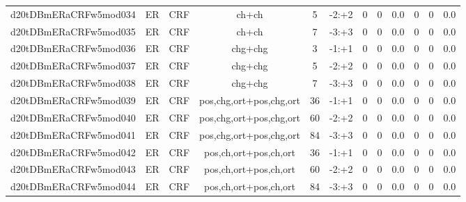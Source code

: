 \documentclass[a4paper]{article}
\begin{document}
\begin{landscape}
\begin{center}
\begin{tabular}{ |c|c|c|c|c|c|c|c|c|c|c|c|}
 
 	
 	\small{ d20tDBmERaCRFw5mod034 } & ER & CRF & ch+ch  &  5 &  -2:+2  &  0 & 0 & 0.0  &  0 & 0 & 0.0 \\
 	

 
 	
 	\small{ d20tDBmERaCRFw5mod035 } & ER & CRF & ch+ch  &  7 &  -3:+3  &  0 & 0 & 0.0  &  0 & 0 & 0.0 \\
 	

 
 	
 	\small{ d20tDBmERaCRFw5mod036 } & ER & CRF & chg+chg  &  3 &  -1:+1  &  0 & 0 & 0.0  &  0 & 0 & 0.0 \\
 	

 
 	
 	\small{ d20tDBmERaCRFw5mod037 } & ER & CRF & chg+chg  &  5 &  -2:+2  &  0 & 0 & 0.0  &  0 & 0 & 0.0 \\
 	

 
 	
 	\small{ d20tDBmERaCRFw5mod038 } & ER & CRF & chg+chg  &  7 &  -3:+3  &  0 & 0 & 0.0  &  0 & 0 & 0.0 \\
 	

 
 	
 	\small{ d20tDBmERaCRFw5mod039 } & ER & CRF & pos,chg,ort+pos,chg,ort  &  36 &  -1:+1  &  0 & 0 & 0.0  &  0 & 0 & 0.0 \\
 	

 
 	
 	\small{ d20tDBmERaCRFw5mod040 } & ER & CRF & pos,chg,ort+pos,chg,ort  &  60 &  -2:+2  &  0 & 0 & 0.0  &  0 & 0 & 0.0 \\
 	

 
 	
 	\small{ d20tDBmERaCRFw5mod041 } & ER & CRF & pos,chg,ort+pos,chg,ort  &  84 &  -3:+3  &  0 & 0 & 0.0  &  0 & 0 & 0.0 \\
 	

 
 	
 	\small{ d20tDBmERaCRFw5mod042 } & ER & CRF & pos,ch,ort+pos,ch,ort  &  36 &  -1:+1  &  0 & 0 & 0.0  &  0 & 0 & 0.0 \\
 	

 
 	
 	\small{ d20tDBmERaCRFw5mod043 } & ER & CRF & pos,ch,ort+pos,ch,ort  &  60 &  -2:+2  &  0 & 0 & 0.0  &  0 & 0 & 0.0 \\
 	

 
 	
 	\small{ d20tDBmERaCRFw5mod044 } & ER & CRF & pos,ch,ort+pos,ch,ort  &  84 &  -3:+3  &  0 & 0 & 0.0  &  0 & 0 & 0.0 \\
 	


\end{tabular}
\end{center}
\end{landscape}
\end{document}
